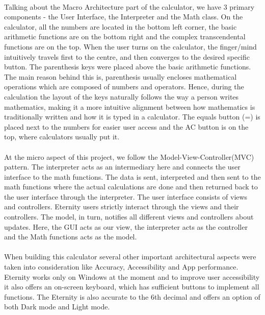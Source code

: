         \paragraph{}
        Talking about the Macro Architecture part of the calculator, we have 3 primary components - the User Interface, the Interpreter and the Math class. On the calculator, all the numbers are located in the bottom left corner, the basic arithmetic functions are on the bottom right and the complex transcendental functions are on the top. When the user turns on the calculator,  the finger/mind intuitively travels first to the centre, and then converges to the desired specific button. The parenthesis keys were placed above the basic arithmetic functions. The main reason behind this is, parenthesis usually encloses mathematical operations which are composed of numbers and operators. Hence, during the calculation the layout of the keys naturally follows the way a person writes mathematics, making it a more intuitive alignment between how mathematics is traditionally written and how it is typed in a calculator. The equals button (=) is placed next to the numbers for easier user access and the AC button is on the top, where calculators usually put it.

        \paragraph{}
        At the micro aspect of this project, we follow the Model-View-Controller(MVC) pattern. The interpreter acts as an intermediary here and connects the user interface to the math functions. The data is sent, interpreted and then sent to the math functions where the actual calculations are done and then returned back to the user interface through the interpreter. The user interface consists of views and controllers. Eternity users strictly interact through the views and their controllers. The model, in turn, notifies all different views and controllers about updates. Here, the GUI acts as our view, the interpreter acts as the controller and the Math functions acts as the model.

        \paragraph{}
        When building this calculator several other important architectural aspects were taken into consideration like Accuracy, Accessibility and App performance. Eternity works only on Windows at the moment and to improve user accessibility it also offers an on-screen keyboard, which has sufficient buttons to implement all functions. The Eternity is also accurate to the 6th decimal and offers an option of both Dark mode and Light mode.

